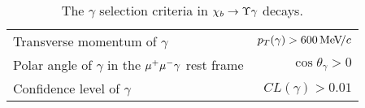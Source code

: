 \begin{table}[H]
\caption{\small The $\gamma$ selection criteria in  $\chi_{b} \rightarrow \Upsilon \gamma$ decays.}
\centering
\begin{tabular}{lr}\toprule
Transverse momentum of $\gamma$ & $p_T(\gamma) > 600 {\mathrm{\,Me\kern -0.1em V\!/}c}$ \\
Polar angle of $\gamma$ in the $\mu^+\mu^-\gamma$ rest frame & $\cos\theta_{\gamma} > 0$ \\
Confidence level of $\gamma$ & $CL(\gamma) > 0.01$ \\
\bottomrule
\end{tabular}
\label{tab:chib:selection:photons}
\end{table}